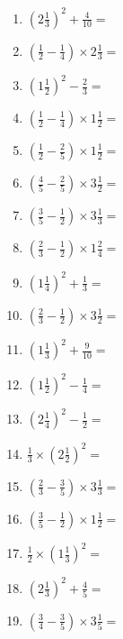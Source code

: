 \documentclass[12pt]{article}
\begin{document}
\begin{enumerate}
\item \large $ \left( 2 \frac{1}{3} \right)^2 + \frac{4}{10} = $ \vspace{1.6cm}
\item \large $ \left( \frac{1}{2} - \frac{1}{4} \right) \times 2 \frac{1}{3} = $ \vspace{1.6cm}
\item \large $ \left( 1 \frac{1}{2} \right)^2 - \frac{2}{3} = $ \vspace{1.6cm}
\item \large $ \left( \frac{1}{2} - \frac{1}{4} \right) \times 1 \frac{1}{2} = $ \vspace{1.6cm}
\item \large $ \left( \frac{1}{2} - \frac{2}{5} \right) \times 1 \frac{1}{2} = $ \vspace{1.6cm}
\item \large $ \left( \frac{4}{5} - \frac{2}{5} \right) \times 3 \frac{1}{2} = $ \vspace{1.6cm}
\item \large $ \left( \frac{3}{5} - \frac{1}{2} \right) \times 3 \frac{1}{3} = $ \vspace{1.6cm}
\item \large $ \left( \frac{2}{3} - \frac{1}{2} \right) \times 1 \frac{2}{4} = $ \vspace{1.6cm}
\item \large $ \left( 1 \frac{1}{4} \right)^2 + \frac{1}{3} = $ \vspace{1.6cm}
\newpage
\item \large $ \left( \frac{2}{3} - \frac{1}{2} \right) \times 3 \frac{1}{2} = $ \vspace{1.6cm}
\item \large $ \left( 1 \frac{1}{3} \right)^2 + \frac{9}{10} = $ \vspace{1.6cm}
\item \large $ \left( 1 \frac{1}{2} \right)^2 - \frac{1}{4} = $ \vspace{1.6cm}
\item \large $ \left( 2 \frac{1}{4} \right)^2 - \frac{1}{2} = $ \vspace{1.6cm}
\item \large $ \frac{1}{3} \times \left( 2 \frac{1}{2} \right)^2 = $ \vspace{1.6cm}
\item \large $ \left( \frac{2}{3} - \frac{3}{5} \right) \times 3 \frac{1}{3} = $ \vspace{1.6cm}
\item \large $ \left( \frac{3}{5} - \frac{1}{2} \right) \times 1 \frac{1}{2} = $ \vspace{1.6cm}
\item \large $ \frac{1}{2} \times \left( 1 \frac{1}{3} \right)^2 = $ \vspace{1.6cm}
\item \large $ \left( 2 \frac{1}{3} \right)^2 + \frac{4}{5} = $ \vspace{1.6cm}
\item \large $ \left( \frac{3}{4} - \frac{3}{5} \right) \times 3 \frac{1}{5} = $ \vspace{1.6cm}
\end{enumerate}\newpage
\end{document}
